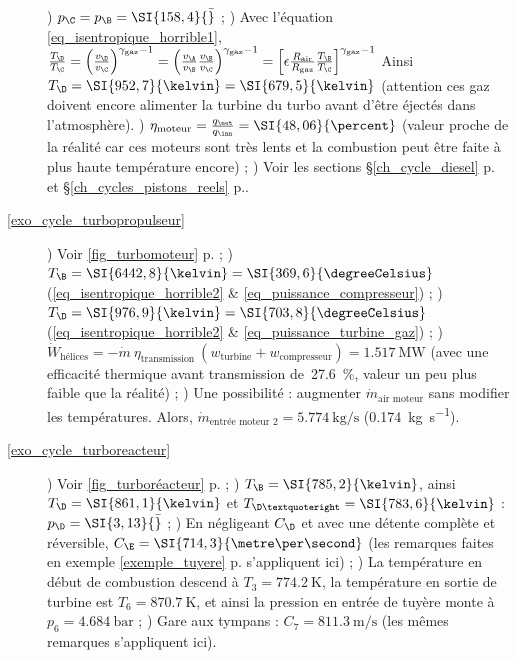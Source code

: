 \begin{description}
	 		) $p_\C = p_\B = \SI{158,4}{\bar}$ ;
	 		) Avec l’équation \ref{eq_isentropique_horrible1}, $\frac{T_\D}{T_\C}
	 				= \left(\frac{v_\D}{v_\C}\right)^{\gamma_\text{gaz} - 1}
	 				= \left(\frac{v_\A}{v_\B} \frac{v_\B}{v_\C}\right)^{\gamma_\text{gaz} - 1}
	 				= \left[\epsilon \frac{R_\text{air}}{R_\text{gaz}} \frac{T_\B}{T_\C}\right]^{\gamma_\text{gaz} - 1}$
	 				Ainsi $T_\D = \SI{952,7}{\kelvin} = \SI{679,5}{\kelvin}$ (attention ces gaz doivent encore alimenter la turbine du turbo avant d’être éjectés dans l’atmosphère).
	 		) $\eta_\text{moteur} = \frac{q_\net}{q_\inn} = \SI{48,06}{\percent}$ (valeur proche de la réalité car ces moteurs sont très lents et la combustion peut être faite à plus haute température encore) ;
	 		) Voir les sections \S\ref{ch_cycle_diesel} p.\pageref{ch_cycle_diesel} et \S\ref{ch_cycles_pistons_reels} p.\pageref{ch_cycles_pistons_reels}.
		\item [\ref{exo_cycle_turbopropulseur}]
			) Voir \cref{fig_turbomoteur} p.\pageref{fig_turbomoteur} ;
	 		) $T_\B = \SI{6442,8}{\kelvin} = \SI{369,6}{\degreeCelsius}$ (\ref{eq_isentropique_horrible2} \& \ref{eq_puissance_compresseur}) ;
	 		) $T_\D = \SI{976,9}{\kelvin} = \SI{703,8}{\degreeCelsius}$ (\ref{eq_isentropique_horrible2} \& \ref{eq_puissance_turbine_gaz}) ;
	 		) $\dot W_\text{hélices} = - \dot m \ \eta_\text{transmission} \ (w_\text{turbine} + w_\text{compresseur}) = \SI{+1,517}{\mega\watt}$ (avec une efficacité thermique avant transmission de~\SI{27,6}{\percent}, valeur un peu plus faible que la réalité) ;
	 		) Une possibilité : augmenter $\dot m_\text{air moteur}$ sans modifier les températures. Alors, $\dot m_\text{entrée~moteur~2} = \SI{5,774}{\kilogram\per\second}$ (\SI{+0,174}{\kilogram\per\second}).
		\item [\ref{exo_cycle_turboreacteur}]
			) Voir \cref{fig_turboréacteur} p.\pageref{fig_turboréacteur} ;
	 		) $T_\B = \SI{785,2}{\kelvin}$, ainsi $T_\D = \SI{861,1}{\kelvin}$ et $T_{\D’} = \SI{783,6}{\kelvin}$ : $p_\D = \SI{3,13}{\bar}$ ;
	 		) En négligeant $C_\D$ et avec une détente complète et réversible, $C_\E = \SI{714,3}{\metre\per\second}$ (les remarques faites en exemple \ref{exemple_tuyere} p.\pageref{exemple_tuyere} s’appliquent ici) ;
	 		) La température en début de combustion descend à $T_3 = \SI{774,2}{\kelvin}$, la température en sortie de turbine est $T_6 = \SI{870,7}{\kelvin}$, et ainsi la pression en entrée de tuyère monte à $p_6 = \SI{4,684}{\bar}$ ;
	 		) Gare aux tympans : $C_7= \SI{811,3}{\metre\per\second}$ (les mêmes remarques s’appliquent ici).

\end{description}
